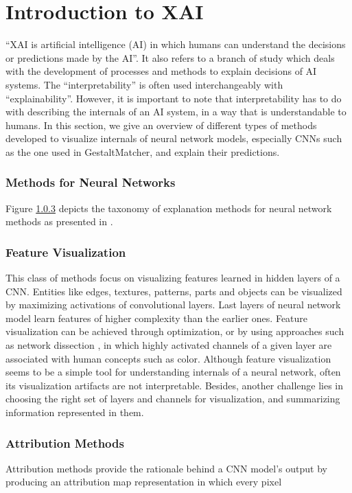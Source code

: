 \documentclass[../report.tex]{subfiles}
\begin{document}
    \section{Introduction to XAI}
	\enquote{XAI is artificial intelligence (AI) in which humans can understand the decisions or predictions made by the AI}\cite{vilone2021notions}. It also refers to a branch of study which deals with the development of processes and methods to explain decisions of AI systems. The \enquote{interpretability} is often used interchangeably with \enquote{explainability}. However, it is important to note that interpretability has to do with describing the internals of an AI system, in a way that is understandable to humans. In this section, we give an overview of different types of methods developed to visualize internals of neural network models, especially CNNs such as the one used in GestaltMatcher, and explain their predictions.
	
	\subsubsection{Methods for Neural Networks}
	Figure \ref{} depicts the taxonomy of explanation methods for neural network methods as presented in \cite{molnar2019}. 
	
	\subsubsection{Feature Visualization}
	This class of methods focus on visualizing features learned in hidden layers of a CNN. Entities like edges, textures, patterns, parts and objects can be visualized by maximizing activations of convolutional layers. Last layers of neural network model learn features of higher complexity than the earlier ones.  Feature visualization can be achieved through optimization, or by using approaches such as network dissection \cite{bau2017network}, in which highly activated channels of a given layer are associated with human concepts such as color. Although feature visualization seems to be a simple tool for understanding internals of a neural network, often its visualization artifacts are not interpretable. Besides, another challenge lies in choosing the right set of layers and channels for visualization, and summarizing information represented in them.

	\subsubsection{Attribution Methods}
	Attribution methods provide the rationale behind a CNN model's output by producing an attribution map representation in which every pixel 
	
\end{document}

